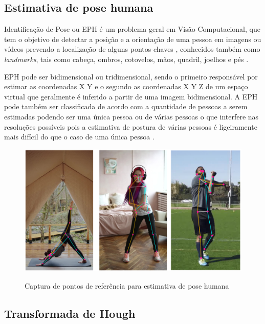 \subsection[Estimativa de pose humana]{Estimativa de pose humana}\label{sec:Estimativa de pose humana}
Identificação de Pose ou \ac{EPH} é um problema geral em Visão Computacional, que tem o objetivo de detectar a posição e a orientação de uma pessoa em imagens ou vídeos prevendo a localização de alguns pontos-chaves , conhecidos também como \textit{landmarks}, tais como  cabeça, ombros, cotovelos, mãos, quadril, joelhos e pés \cite{edh}.

\ac{EPH} pode ser bidimensional ou tridimensional, sendo o primeiro responsável por estimar as coordenadas X Y e o segundo as coordenadas X Y Z de um espaço virtual que geralmente é inferido a partir de uma imagem bidimensional. A \ac{EPH} pode também ser classificada de acordo com a quantidade de pessoas a serem estimadas podendo ser uma única pessoa ou de várias pessoas o que interfere nas resoluções possíveis pois a estimativa de postura de várias pessoas é ligeiramente mais difícil do que o caso de uma única pessoa \cite{edhDeep}.

\begin{figure}[H]
	\centering
    \caption{Captura de pontos de referência para estimativa de pose humana}
	\includegraphics[scale=0.2]{figuras/eph/keypoint.jpg}
	\label{fig:Captura de pontos de referencia para estimativa de pose humana}
\end{figure}





\subsection[Transformada de Hough]{Transformada de Hough}\label{sec:Transformada de Hough}


